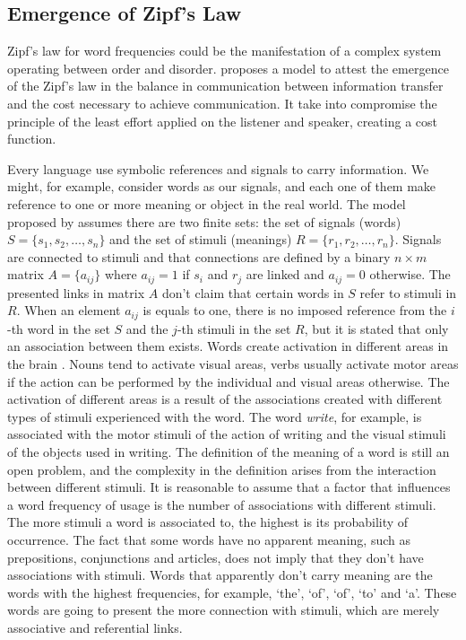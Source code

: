 \subsection{Emergence of Zipf's Law}
Zipf’s law for word frequencies could be the manifestation of a complex system 
operating between order and disorder. \cite{ramon2003,cancho2005} proposes a model to attest the
emergence of the Zipf's law in the balance in communication between information
transfer and the cost necessary to achieve communication. It take into compromise the principle of the least 
effort applied on the listener and speaker, creating a cost function.

Every language use symbolic references and signals to carry information.
We might, for example, consider words as our signals, and each one of them
make reference to one or more meaning or object in the real world.
The model proposed by \cite{ramon2003,cancho2005} assumes there are two finite sets:
the set of signals (words) $S = \{ s_1, s_2, \ldots , s_n \}$ and the set of 
stimuli (meanings) $R = \{ r_1, r_2, \ldots , r_n \}$. Signals are connected
to stimuli and that connections are defined by a binary $n \times m$ matrix
$A = \{ a_{ij} \}$ where $a_{ij} = 1$ if $s_i$ and $r_j$ are linked and
$a_{ij} = 0$ otherwise. The presented links in matrix $A$ don't claim that certain
words in $S$ refer to stimuli in $R$. When an element $a_{ij}$ is equals to one,
there is no imposed reference from the $i$-th word in the set $S$ and the
$j$-th stimuli in the set $R$, but it is stated that only an association between them exists.
Words create activation in different areas in the brain \citep{pulvermuller2003}. 
Nouns tend to activate
visual areas, verbs usually activate motor areas if the action can be performed by
the individual and visual areas otherwise. The activation of different areas is
a result of the associations created with different types of stimuli experienced with
the word. The word \textit{write}, for example, is associated with the motor stimuli
of the action of writing and the visual stimuli of the objects used in writing.
The definition of the meaning of a word is still an open problem, and the complexity
in the definition arises from the interaction between different stimuli.
It is reasonable to assume that a factor that influences a word frequency of usage
is the number of associations with different stimuli. The more stimuli a word is
associated to, the highest is its probability of occurrence. The fact that some 
words have no apparent meaning, such as prepositions, conjunctions and articles, 
does not imply that they don't have associations with stimuli. Words that apparently
don't carry meaning are the words with the highest frequencies, for example,
`the', `of', `of', `to' and `a'. These words are going to present the more connection
 with stimuli, which are merely associative and referential links.

